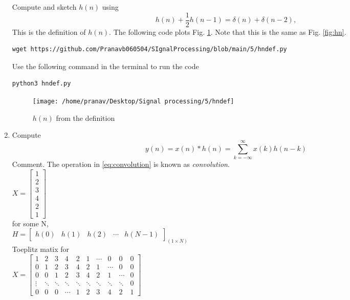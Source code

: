 \documentclass[journal,12pt,twocolumn]{IEEEtran}
\renewcommand\thesection{\arabic{section}}
\begin{document}
\begin{enumerate}[label=\thesection.\arabic*]
Compute and sketch $h(n)$ using 
\begin{equation}
\label{eq:iir_filter_h}
h(n) + \frac{1}{2}h(n-1) = \delta(n) + \delta(n-2), 
\end{equation}
%
This is the definition of $h(n)$.
\solution The following code plots Fig. \ref{fig:hndef}. Note that this is the same as Fig. 
\ref{fig:hn}. 
%
\begin{lstlisting}
wget https://github.com/Pranavb060504/SIgnalProcessing/blob/main/5/hndef.py
\end{lstlisting}
Use the following command in the terminal to run the code
\begin{lstlisting}
python3 hndef.py
\end{lstlisting}
\begin{figure}[!ht]
\centering
\texttt{[image: /home/pranav/Desktop/Signal processing/5/hndef]}
\caption{$h(n)$ from the definition}
\label{fig:hndef}
\end{figure}
%
\item Compute 
%
\begin{equation}
\label{eq:convolution}
y(n) = x(n)*h(n) = \sum_{k=-\infty}^{\infty}x(k)h(n-k)
\end{equation}
%
Comment. The operation in \eqref{eq:convolution} is known as
{\em convolution}.
%
\\
\solution
 $X=\begin{bmatrix}
1 \\2 \\3 \\4 \\2 \\1
\end{bmatrix} $\\
for some N,\\
$H=\begin{bmatrix}
h(0) & h(1) & h(2) & \cdots & h(N-1)
\end{bmatrix}_{(1 \times N)}$\\
Toeplitz matix for \\
$X=\begin{bmatrix}
1 & 2 & 3 & 4 & 2 & 1 & \cdots & 0 & 0& 0\\
0 & 1 & 2 & 3 & 4 & 2 & 1 & \cdots &0 & 0\\
0 & 0 & 1 & 2 & 3 & 4 & 2 & 1 & \cdots & 0\\
\vdots & \ddots & \ddots & \ddots & \ddots & \ddots & \ddots  & \ddots  & \ddots & 0\\
0 & 0 & 0 &\cdots & 1 & 2 & 3 & 4 & 2 & 1
\end{bmatrix}$

\end{enumerate}
\end{document}
